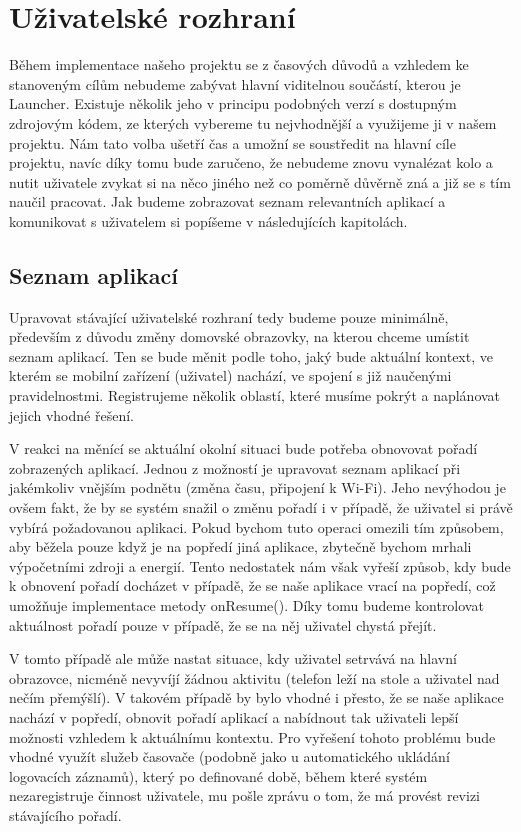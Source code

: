 \documentclass[thesis=M,czech]{FITthesis}[2012/06/26]
\begin{document}
\section{Uživatelské rozhraní}
Během implementace našeho projektu se z časových důvodů a vzhledem ke stanoveným cílům nebudeme zabývat hlavní viditelnou součástí, kterou je Launcher. Existuje několik jeho v principu podobných verzí s dostupným zdrojovým kódem, ze kterých vybereme tu nejvhodnější a využijeme ji v našem projektu. Nám tato volba ušetří čas a umožní se soustředit na hlavní cíle projektu, navíc díky tomu bude zaručeno, že nebudeme znovu vynalézat kolo a nutit uživatele zvykat si na něco jiného než co poměrně důvěrně zná a již se s tím naučil pracovat. Jak budeme zobrazovat seznam relevantních aplikací a komunikovat s uživatelem si popíšeme v následujících kapitolách.

\subsection{Seznam aplikací}\label{app_list}
Upravovat stávající uživatelské rozhraní tedy budeme pouze minimálně, především z důvodu změny domovské obrazovky, na kterou chceme umístit seznam aplikací. Ten se bude měnit podle toho, jaký bude aktuální kontext, ve kterém se mobilní zařízení (uživatel) nachází, ve spojení s již naučenými pravidelnostmi. Registrujeme několik oblastí, které musíme pokrýt a naplánovat jejich vhodné řešení.

V reakci na měnící se aktuální okolní situaci bude potřeba obnovovat pořadí zobrazených aplikací. Jednou z možností je upravovat seznam aplikací při jakémkoliv vnějším podnětu (změna času, připojení k Wi-Fi). Jeho nevýhodou je ovšem fakt, že by se systém snažil o změnu pořadí i v případě, že uživatel si právě vybírá požadovanou aplikaci. Pokud bychom tuto operaci omezili tím způsobem, aby běžela pouze když je na popředí jiná aplikace, zbytečně bychom mrhali výpočetními zdroji a energií. Tento nedostatek nám však vyřeší způsob, kdy bude k obnovení pořadí docházet v případě, že se naše aplikace vrací na popředí, což umožňuje implementace metody onResume(). Díky tomu budeme kontrolovat aktuálnost pořadí pouze v případě, že se na něj uživatel chystá přejít.

V tomto případě ale může nastat situace, kdy uživatel setrvává na hlavní obrazovce, nicméně nevyvíjí žádnou aktivitu (telefon leží na stole a uživatel nad nečím přemýšlí). V takovém případě by bylo vhodné i přesto, že se naše aplikace nachází v popředí, obnovit pořadí aplikací a nabídnout tak uživateli lepší možnosti vzhledem k aktuálnímu kontextu. Pro vyřešení tohoto problému bude vhodné využít služeb časovače (podobně jako u automatického ukládání logovacích záznamů), který po definované době, během které systém nezaregistruje činnost uživatele, mu pošle zprávu o tom, že má provést revizi stávajícího pořadí.
\end{document}
